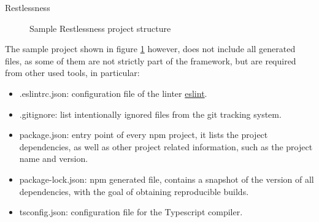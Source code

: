 \begin{chapter}{Restlessness}
    \begin{figure}
        \caption{Sample Restlessness project structure}
        \label{fig:sample_rln_project_folder}
        \begin{minipage}{\linewidth}
        \end{minipage}
    \end{figure}

    The sample project shown in figure \ref{fig:sample_rln_project_folder} however,
    does not include all generated files, as some of them are not strictly part of the
    framework, but are required from other used tools, in particular:
    \begin{itemize}
        \item .eslintrc.json: configuration file of the linter
            \href{https://eslint.org/}{eslint}.
        \item .gitignore: list intentionally ignored files from the git tracking system.
        \item package.json: entry point of every npm project, it lists the project
            dependencies, as well as other project related information, such as
            the project name and version.
        \item package-lock.json: npm generated file, contains a snapshot of the
            version of all dependencies, with the goal of obtaining reproducible builds.
        \item tsconfig.json: configuration file for the Typescript compiler.
    \end{itemize}


\end{chapter}
